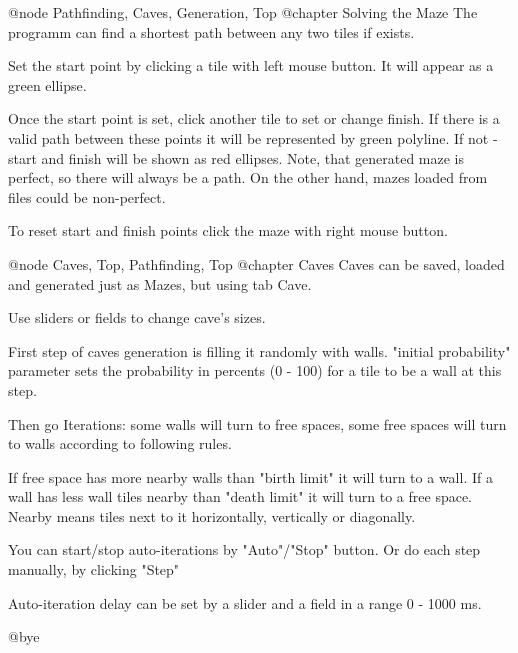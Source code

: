 @node Pathfinding, Caves, Generation, Top
@chapter Solving the Maze
  The programm can find a shortest path between any two tiles if exists.

  Set the start point by clicking a tile with left mouse button. It will appear as a green ellipse.

  Once the start point is set, click another tile to set or change finish. If there is a valid path between these points it will be represented by green polyline. If not - start and finish will be shown as red ellipses. Note, that generated maze is perfect, so there will always be a path. On the other hand, mazes loaded from files could be non-perfect.

  To reset start and finish points click the maze with right mouse button.

@node Caves, Top, Pathfinding, Top
@chapter Caves
  Caves can be saved, loaded and generated just as Mazes, but using tab Cave.

  Use sliders or fields to change cave's sizes.

  First step of caves generation is filling it randomly with walls. "initial probability" parameter sets the probability in percents (0 - 100) for a tile to be a wall at this step.

  Then go Iterations: some walls will turn to free spaces, some free spaces will turn to walls according to following rules.

  If free space has more nearby walls than "birth limit" it will turn to a wall. If a wall has less wall tiles nearby than "death limit" it will turn to a free space. Nearby means tiles next to it horizontally, vertically or diagonally.

  You can start/stop auto-iterations by "Auto"/"Stop" button. Or do each step manually, by clicking "Step"

  Auto-iteration delay can be set by a slider and a field in a range 0 - 1000 ms.

@bye